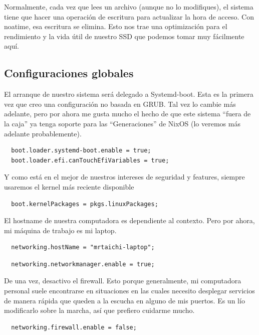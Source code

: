 \documentclass[11pt]{article}
\begin{document}
Normalmente, cada vez que lees un archivo (aunque no lo modifiques), el sistema tiene que hacer una operación de escritura para actualizar la hora de acceso. Con noatime, esa escritura se elimina. Esto nos trae una optimización para el rendimiento y la vida útil de nuestro SSD que podemos tomar muy fácilmente aquí.
\subsection{Configuraciones globales}
\label{sec:org32b050d}

El arranque de nuestro sistema será delegado a Systemd-boot. Esta es la primera vez que creo una configuración no basada en GRUB. Tal vez lo cambie más adelante, pero por ahora me gusta mucho el hecho de que este sistema ``fuera de la caja'' ya tenga soporte para las ``Generaciones'' de NixOS (lo veremos más adelante probablemente).

\begin{verbatim}
  boot.loader.systemd-boot.enable = true;
  boot.loader.efi.canTouchEfiVariables = true;
\end{verbatim}

Y como está en el mejor de nuestros intereses de seguridad y features, siempre usaremos el kernel más reciente disponible

\begin{verbatim}
  boot.kernelPackages = pkgs.linuxPackages;
\end{verbatim}

El hostname de nuestra computadora es dependiente al contexto. Pero por ahora, mi máquina de trabajo es mi laptop.

\begin{verbatim}
  networking.hostName = "mrtaichi-laptop";
\end{verbatim}

\begin{verbatim}
  networking.networkmanager.enable = true;
\end{verbatim}

De una vez, desactivo el firewall. Esto porque generalmente, mi computadora personal suele encontrarse en situaciones en las cuales necesito desplegar servicios de manera rápida que queden a la escucha en alguno de mis puertos. Es un lío modificarlo sobre la marcha, así que prefiero cuidarme mucho.

\begin{verbatim}
  networking.firewall.enable = false;
\end{verbatim}
\end{document}
